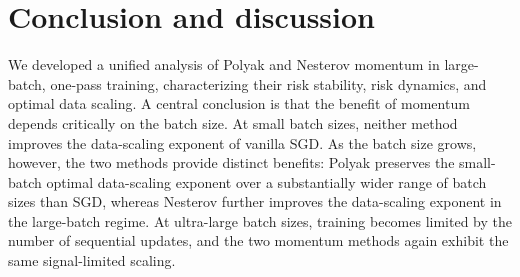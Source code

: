 \documentclass[11pt]{article}
\newcommand{\polyak}{\mathrm{polyak}}
\newcommand{\nesterov}{\mathrm{nesterov}}
\begin{document}



\section{Conclusion and discussion}

We developed a unified analysis of Polyak and Nesterov momentum in large-batch, one-pass training, characterizing their risk stability, risk dynamics, and optimal data scaling. A central conclusion is that the benefit of momentum depends critically on the batch size. At small batch sizes, neither method improves the data-scaling exponent of vanilla SGD. As the batch size grows, however, the two methods provide distinct benefits: Polyak preserves the small-batch optimal data-scaling exponent over a substantially wider range of batch sizes than SGD, whereas Nesterov further improves the data-scaling exponent in the large-batch regime. At ultra-large batch sizes, training becomes limited by the number of sequential updates, and the two momentum methods again exhibit the same signal-limited scaling.
\end{document}

